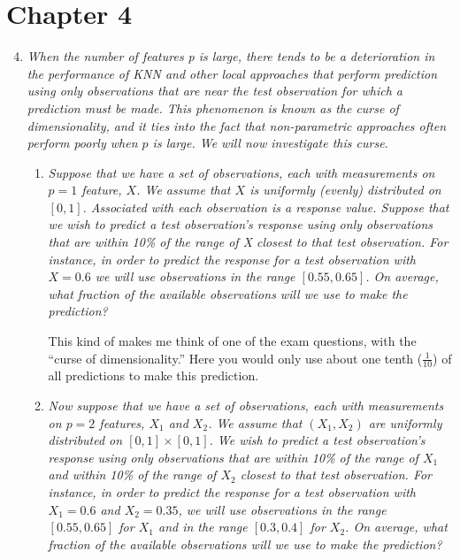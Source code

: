 \documentclass[11pt]{article}
\begin{document}
    
    
\bigskip

\section*{Chapter 4}

\begin{enumerate}
\setcounter{enumi}{3}
    \item \textit{When the number of features p is large, there tends to be a deterioration in the performance of KNN and other local approaches that perform prediction using only observations that are near the test observation for which a prediction must be made. This phenomenon is known as the curse of dimensionality, and it ties into the fact that non-parametric approaches often perform poorly when $p$ is large. We will now investigate this curse.}

    \begin{enumerate}

        \item \textit{Suppose that we have a set of observations, each with measurements on $p = 1$ feature, $X$. We assume that $X$ is uniformly (evenly) distributed on $[0,1]$. Associated with each observation is a response value. Suppose that we wish to predict a test observation’s response using only observations that are within 10\% of the range of X closest to that test observation. For instance, in order to predict the response for a test observation with $X = 0.6$ we will use observations in the range $[0.55,0.65]$. On average, what fraction of the available observations will we use to make the prediction?}

This kind of makes me think of one of the exam questions, with the ``curse of dimensionality.'' Here you would only use about one tenth ($\frac{1}{10}$) of all predictions to make this prediction.

        \item \textit{Now suppose that we have a set of observations, each with measurements on $p = 2$ features, $X_1$ and $X_2$. We assume that $(X_1,X_2)$ are uniformly distributed on $[0,1] \times [0,1]$. We wish to predict a test observation’s response using only observations that are within 10\% of the range of $X_1$ and within 10\% of the range of $X_2$ closest to that test observation. For instance, in order to predict the response for a test observation with $X_1 = 0.6$ and $X_2 = 0.35$, we will use observations in the range $[0.55, 0.65]$ for $X_1$ and in the range $[0.3, 0.4]$ for $X_2$. On average, what fraction of the available observations will we use to make the prediction?}


\end{enumerate}
\end{enumerate}
\end{document}
